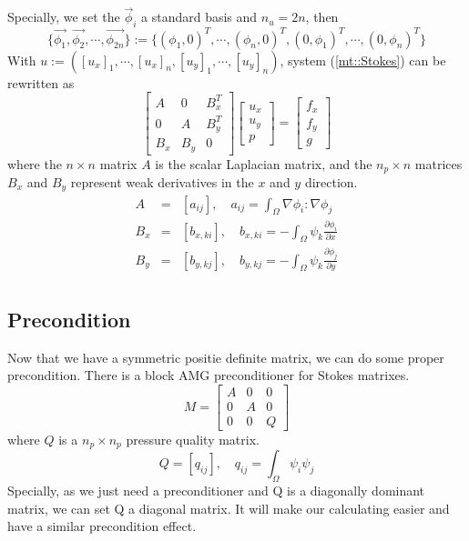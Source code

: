\documentclass[a4paper]{article}
\begin{document}
Specially, we set the {$\vec{\phi}_i$} a standard basis and $n_u = 2n$, then
\begin{equation}
\{\vec{\phi_1},\vec{\phi_2},\cdots,\vec{\phi_{2n}} \}:=\{(\phi_1,0)^T,\cdots,(\phi_n,0)^T,(0,\phi_1)^T,\cdots,(0,\phi_n)^T\}
\label{eq::basisfunction}
\end{equation}
With $u:=([u_x]_1,\cdots,[u_x]_n,[u_y]_1,\cdots,[u_y]_n)$, system (\ref{mt::Stokes}) can be rewritten as
\begin{equation}
\left[ \begin{array}{ccc}
A & 0 & B_x^T \\
0 & A & B_y^T \\
B_x & B_y & 0
\end{array}
\right]
\left[\begin{array}{ccc}
u_x\\
u_y\\
p
\end{array}
\right]=
\left[\begin{array}{ccc}
f_x\\
f_y\\
g
\end{array}
\right]
\label{Stokes}
\end{equation}
where the $n\times n$ matrix $A$ is the scalar Laplacian matrix, and the $n_p\times n$ matrices $B_x$ and $B_y$ represent weak derivatives in the $x$ and $y$ direction. 	
\begin{equation}
\begin{array}{rcl}
A &=& [a_{ij}], \quad a_{ij} = \int_{\Omega} \nabla \phi_i : \nabla \phi_j \\
B_x &=& [b_{x,ki}], \quad b_{x,ki} = -\int_{\Omega} \psi_k \frac{\partial \phi_i}{\partial x} \\
B_y &=& [b_{y,kj}], \quad b_{y,kj} = -\int_{\Omega} \psi_k \frac{\partial \phi_j}{\partial y} \\
\end{array}
\label{Stokes-mtvalue}
\end{equation}
\subsection{Precondition}
Now that we have a symmetric positie definite matrix, we can do some proper precondition. There is a block AMG preconditioner for Stokes matrixes.
\begin{equation}
M = \left[ \begin{array}{ccc}
A & 0 & 0 \\
0 & A & 0 \\
0 & 0 & Q
\end{array}
\right]
\end{equation}
where $Q$ is a $n_p\times n_p$ pressure quality matrix.
\begin{equation}
Q = [q_{ij}], \quad q_{ij} = \int_{\Omega} \psi_i\psi_j
\label{pr::Q}
\end{equation}
Specially, as we just need a preconditioner and Q is a diagonally dominant matrix, we can set Q a diagonal matrix. It will make our calculating easier and have a similar precondition effect.
\end{document}
